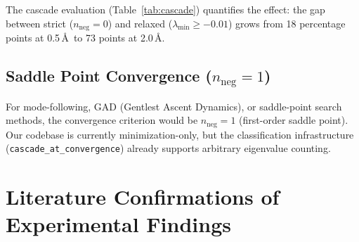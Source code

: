 \documentclass[11pt,a4paper]{article}
\theoremstyle{definition}
\begin{document}
The cascade evaluation (Table~\ref{tab:cascade}) quantifies the effect:
the gap between strict ($n_\text{neg}=0$) and relaxed ($\lambda_\text{min}
\geq -0.01$) grows from 18 percentage points at 0.5\,\AA\ to 73 points at
2.0\,\AA.

\subsection{Saddle Point Convergence ($n_\text{neg}=1$)}

For mode-following, GAD (Gentlest Ascent Dynamics), or saddle-point search
methods, the convergence criterion would be $n_\text{neg}=1$ (first-order
saddle point).  Our codebase is currently minimization-only, but the
classification infrastructure (\texttt{cascade\_at\_convergence}) already
supports arbitrary eigenvalue counting.

\section{Literature Confirmations of Experimental Findings}
\label{sec:confirmations}
\end{document}
